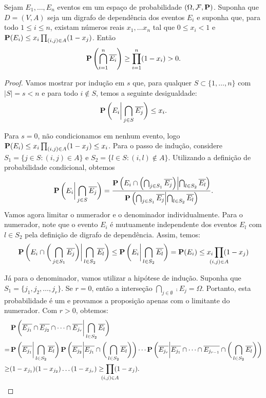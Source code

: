 \begin{lemma}
\label{thm:prob:lll}
Sejam $E_1, \dots, E_n$ eventos em um espaço de probabilidade $(\Omega, \mathcal{F}, \operatorname{\mathbf{P}})$. Suponha que $D = (V, A)$ seja um digrafo de dependência dos eventos $E_i$ e suponha que, para todo $1 \leq i \leq n$, existam números reais $x_1, \dotsc x_n$ tal que $0 \leq x_i < 1$ e $\operatorname{\mathbf{P}} (E_i) \leq x_i \prod_{(i,j) \in A}(1-x_j)$. Então
\[ \operatorname{\mathbf{P}} \left( \bigcap_{i = 1}^n \overline{E_i} \right) \geq \prod_{i = 1}^n (1 - x_i) > 0.\]
\end{lemma}
\begin{proof}
Vamos mostrar por indução em $s$ que, para qualquer $S \subset \{1, \dots, n\}$ com $|S| = s < n$ e para todo $i \not\in S$, temos a seguinte desigualdade:
\[ \operatorname{\mathbf{P}}\bigg( E_i \bigg| \bigcap_{j \in S} \overline{E_j} \bigg) \leq x_i.\]

Para $s = 0$, não condicionamos em nenhum evento, logo $\operatorname{\mathbf{P}}(E_i) \leq x_i \prod_{(i,j) \in A}(1-x_j) \leq x_i$. Para o passo de indução, considere $S_1 = \{ j \in S : (i,j) \in A\}$ e $S_2 = \{ l \in S : (i,l) \not\in A \}$. Utilizando a definição de probabilidade condicional, obtemos
\begin{align*}
  \operatorname{\mathbf{P}}\bigg( E_i \bigg| \bigcap_{j \in S} \overline{E_j} \bigg) = \frac{\operatorname{\mathbf{P}}\left( E_i \cap \left(\bigcap_{j \in S_1} \overline{E_j} \right) \middle| \bigcap_{l \in S_2} \overline{E_l} \right)}{\operatorname{\mathbf{P}}\left( \bigcap_{j \in S_1} \overline{E_j} \middle| \bigcap_{l \in S_2} \overline{E_l} \right)}.
\end{align*}
Vamos agora limitar o numerador e o denominador individualmente. Para o numerador, note que o evento $E_i$ é mutuamente independente dos eventos $E_l$ com $l \in S_2$ pela definição de digrafo de dependência. Assim, temos:
\[ \prob\bigg( E_i \cap \bigg(\bigcap_{j \in S_1} \comp{E_j} \bigg) \bigg| \bigcap_{l \in S_2} \comp{E_l} \bigg) \leq \prob\bigg( E_i \bigg| \bigcap_{l \in S_2} \comp{E_l} \bigg) = \prob(E_i) \leq x_i \prod_{\mathclap{(i,j) \in A}}(1-x_j) \]

Já para o denominador, vamos utilizar a hipótese de indução. Suponha que $S_1 = \{j_1, j_2, \dots, j_r \}$. Se $r = 0$, então a interseção $\bigcap_{j \in \emptyset} \comp{E_j}  = \Omega$. Portanto, esta probabilidade é um e provamos a proposição apenas com o limitante do numerador. Com $r > 0$, obtemos:
\begin{align*}
&\prob \bigg( \comp{E_{j_1}} \cap \comp{E_{j_2}} \cap \dots \cap \comp{E_{j_r}} \bigg| \bigcap_{l \in S_2} \comp{E_l} \bigg) \\
=&\prob \bigg( \comp{E_{j_1}} \bigg| \bigcap_{l \in S_2} \comp{E_l} \bigg) \prob \bigg( \comp{E_{j_2}} \bigg| \comp{E_{j_1}} \cap \bigg(\bigcap_{l \in S_2} \comp{E_l} \bigg) \bigg) \cdots \prob \bigg( \comp{E_{j_r}} \bigg| \comp{E_{j_1}} \cap \dots \cap \comp{E_{j_{r-1}}} \cap \bigg(\bigcap_{l \in S_2} \comp{E_l}\bigg) \bigg) \\
\geq&(1-x_{j_1})(1-x_{j_2})\dots(1-x_{j_r}) \geq \prod_{\mathclap{(i,j) \in A}}(1-x_j).
\end{align*}


\end{proof}
